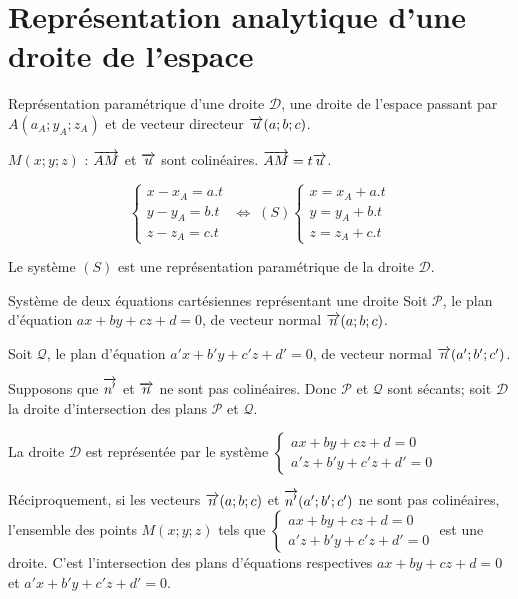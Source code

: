 \section{Représentation analytique d'une droite de l'espace}
\begin{bclogo}{Représentation paramétrique d'une droite}
$\mathcal{D}$, une droite de l'espace passant par $A(a_A;y_A;z_A)$ et de vecteur directeur $\overrightarrow{u}(a;b;c)$.

$M(x;y;z)$ : $\overrightarrow{AM}$ et $\overrightarrow{u}$ sont colinéaires. $\overrightarrow{AM}=t\overrightarrow{u}$.

\[\left\lbrace\begin{array}{l} x-x_A=a.t\\ y-y_A=b.t\\ z-z_A=c.t \end{array}\right.\;\Longleftrightarrow\;(S)\left\lbrace\begin{array}{l} x=x_A+a.t\\ y=y_A+b.t\\ z=z_A+c.t \end{array}\right.\]

Le système $(S)$ est une représentation paramétrique de la droite $\mathcal{D}$.
\end{bclogo}

\medskip

\begin{bclogo}{Système de deux équations cartésiennes représentant une droite}
Soit $\mathcal{P}$, le plan d'équation $ax+by+cz+d=0$, de vecteur normal $\overrightarrow{n} (a;b;c)$.

Soit $\mathcal{Q}$, le plan d'équation $a'x+b'y+c'z+d'=0$, de vecteur normal $\overrightarrow{n} (a';b';c')$.

Supposons que $\overrightarrow{n'}$ et $\overrightarrow{n}$ ne sont pas colinéaires. Donc $\mathcal{P}$ et $\mathcal{Q}$ sont sécants; soit $\mathcal{D}$ la droite d'intersection des plans $\mathcal{P}$ et $\mathcal{Q}$.

La droite $\mathcal{D}$ est représentée par le système $\left\lbrace\begin{array}{l} ax+by+cz+d=0\\ a'z+b'y+c'z+d'=0 \end{array}\right.$

Réciproquement, si les vecteurs $\overrightarrow{n}(a;b;c)$ et $\overrightarrow{n'}(a';b';c')$ ne sont pas colinéaires, l'ensemble des points $M(x;y;z)$  tels que $\left\lbrace\begin{array}{l} ax+by+cz+d=0\\ a'z+b'y+c'z+d'=0 \end{array}\right.$ est une droite. C'est l'intersection des plans d'équations respectives $ax+by+cz+d=0$ et $a'x+b'y+c'z+d'=0$.
\end{bclogo}